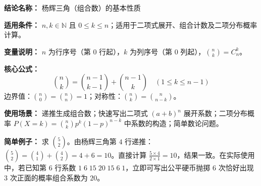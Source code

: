 \textbf{结论名称：} 杨辉三角（组合数）的基本性质

\textbf{适用条件：} \(n,k\in\mathbb{N}\) 且 \(0\leq k\leq n\)；适用于二项式展开、组合计数及二项分布概率计算。

\textbf{变量说明：} \(n\) 为行序号（第 \(0\) 行起），\(k\) 为列序号（第 \(0\) 列起），\(\binom{n}{k}=C_n^k\)。

\textbf{核心公式：}
\[
\boxed{\binom{n}{k}=\binom{n-1}{k-1}+\binom{n-1}{k}}\quad (1\leq k\leq n-1)
\]
边界值：\(\binom{n}{0}=\binom{n}{n}=1\)；对称性：\(\binom{n}{k}=\binom{n}{n-k}\)。

\textbf{使用场景：} 递推生成组合数；快速写出二项式 \((a+b)^n\) 展开系数；二项分布概率 \(P(X=k)=\binom{n}{k}p^k(1-p)^{n-k}\) 中系数的构造；简单数论问题。

\textbf{简单例子：} 求 \(\binom{5}{2}\)。由杨辉三角第 \(4\) 行递推：\(\binom{5}{2}=\binom{4}{1}+\binom{4}{2}=4+6=10\)。直接计算 \(\frac{5\times4}{2\times1}=10\)，结果一致。在实际使用中，若已知第 \(6\) 行系数 \(1\;6\;15\;20\;15\;6\;1\)，立即可写出公平硬币抛掷 \(6\) 次恰好出现 \(3\) 次正面的概率组合系数为 \(20\)。